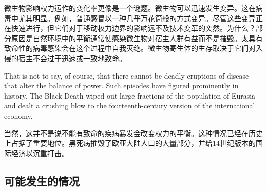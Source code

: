\begin{paracol}{2}
\switchcolumn
微生物影响权力运作的变化率更像是一个谜题。微生物可以迅速发生变异。这在病毒中尤其明显。例如，普通感冒以一种几乎万花筒般的方式变异。尽管这些变异正在快速进行，但它们对于移动权力边界的影响远不及技术变革的突然。为什么？部分原因是自然环境中的平衡通常使感染微生物对宿主人群有益而不是摧毁。太具有致命性的病毒感染会在这个过程中自我灭绝。微生物寄生体的生存取决于它们对入侵的宿主不会过于迅速或一致地致命。

\switchcolumn*
That is not to say, of course, that there cannot be deadly eruptions of disease that alter the balance of power. Such episodes have figured prominently in history. The Black Death wiped out large fractions of the population of Eurasia and dealt a crushing blow to the fourteenth-century version of the international economy.

\switchcolumn
当然，这并不是说不能有致命的疾病暴发会改变权力的平衡。这种情况已经在历史上占据了重要地位。黑死病摧毁了欧亚大陆人口的大量部分，并给14世纪版本的国际经济以沉重打击。

\end{paracol}

\subsection{可能发生的情况}


